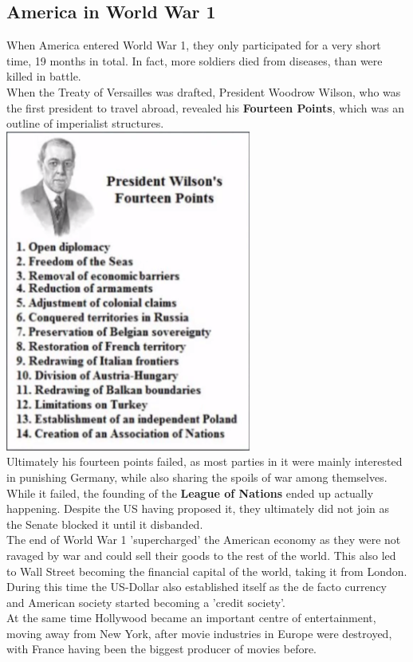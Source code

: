 \documentclass{article}
\begin{document}
	\subsection{America in World War 1}
	When America entered World War 1, they only participated for a very short time, 19 months in total. In fact, more soldiers died from diseases, than were killed in battle. \\
	When the Treaty of Versailles was drafted, President Woodrow Wilson, who was the first president to travel abroad, revealed his \textbf{Fourteen Points}, which was an outline of imperialist structures. \\
	\includegraphics{Fourteen_Points.png} \\
	Ultimately his fourteen points failed, as most parties in it were mainly interested in punishing Germany, while also sharing the spoils of war among themselves. While it failed, the founding of the \textbf{League of Nations} ended up actually happening. Despite the US having proposed it, they ultimately did not join as the Senate blocked it until it disbanded. \\
	The end of World War 1 'supercharged' the American economy as they were not ravaged by war and could sell their goods to the rest of the world. This also led to Wall Street becoming the financial capital of the world, taking it from London. During this time the US-Dollar also established itself as the de facto currency and American society started becoming a 'credit society'. \\
	At the same time Hollywood became an important centre of entertainment, moving away from New York, after movie industries in Europe were destroyed, with France having been the biggest producer of movies before. \\
\end{document}
